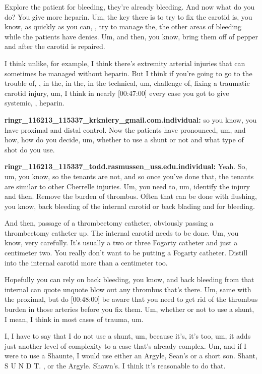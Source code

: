 \documentclass[
]{book}
\begin{document}
Explore the patient for bleeding, they're already bleeding. And now what
do you do? You give more heparin. Um, the key there is to try to fix the
carotid is, you know, as quickly as you can, , try to manage the, the
other areas of bleeding while the patients have denies. Um, and then,
you know, bring them off of pepper and after the carotid is repaired.

I think unlike, for example, I think there's extremity arterial injuries
that can sometimes be managed without heparin. But I think if you're
going to go to the trouble of, , in the, in the, in the technical, um,
challenge of, fixing a traumatic carotid injury, um, I think in nearly
{[}00:47:00{]} every case you got to give systemic, , heparin.

\textbf{ringr\_116213\_115337\_krkniery\_gmail.com.individual:} so you know, you
have proximal and distal control. Now the patients have pronounced, um,
and how, how do you decide, um, whether to use a shunt or not and what
type of shot do you use.

\textbf{ringr\_116213\_115337\_todd.rasmussen\_uss.edu.individual:} Yeah. So, um,
you know, so the tenants are not, and so once you've done that, the
tenants are similar to other Cherrelle injuries. Um, you need to, um,
identify the injury and then. Remove the burden of thrombus. Often that
can be done with flushing, you know, back bleeding of the internal
carotid or back blading and for bleeding.

And then, passage of a thrombectomy catheter, obviously passing a
thrombectomy catheter up. The internal carotid needs to be done. Um, you
know, very carefully. It's usually a two or three Fogarty catheter and
just a centimeter two. You really don't want to be putting a Fogarty
catheter. Distill into the internal carotid more than a centimeter too.

Hopefully you can rely on back bleeding, you know, and back bleeding
from that internal can quote unquote blow out any thrombus that's there.
Um, same with the proximal, but do {[}00:48:00{]} be aware that you need to
get rid of the thrombus burden in those arteries before you fix them.
Um, whether or not to use a shunt, I mean, I think in most cases of
trauma, um.

I, I have to say that I do not use a shunt, um, because it's, it's too,
um, it adds just another level of complexity to a case that's already
complex. Um, and if I were to use a Shaunte, I would use either an
Argyle, Sean's or a short son. Shant, S U N D T. , or the Argyle.
Shawn's. I think it's reasonable to do that.
\end{document}
